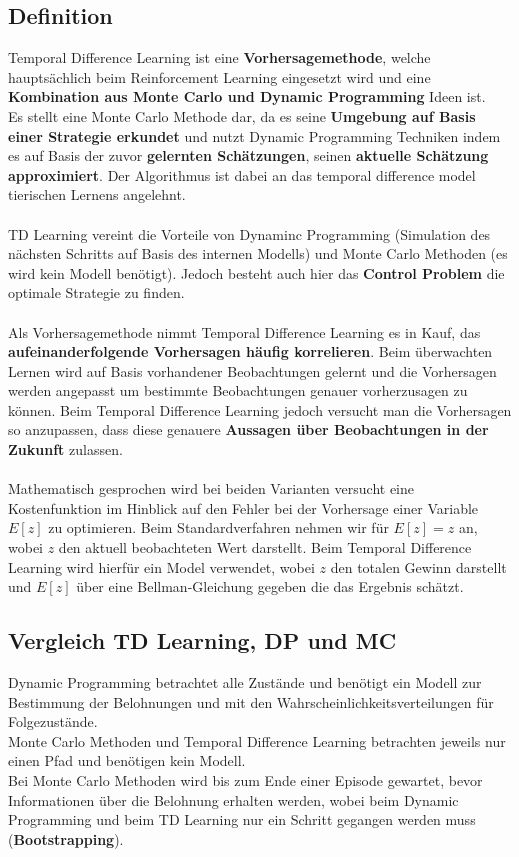 \documentclass[10pt]{scrartcl}
\begin{document}
\subsection{Definition}
Temporal Difference Learning ist eine \textbf{Vorhersagemethode}, welche hauptsächlich beim Reinforcement Learning eingesetzt wird und eine \textbf{Kombination aus Monte Carlo und Dynamic Programming} Ideen ist.\\
Es stellt eine Monte Carlo Methode dar, da es seine \textbf{Umgebung auf Basis einer Strategie erkundet} und nutzt Dynamic Programming Techniken indem es auf Basis der zuvor \textbf{gelernten Schätzungen}, seinen \textbf{aktuelle Schätzung approximiert}. Der Algorithmus ist dabei an das \glqq temporal difference model\grqq\xspace tierischen Lernens angelehnt.\\
\\
TD Learning vereint die Vorteile von Dynaminc Programming (Simulation des nächsten Schritts auf Basis des internen Modells) und Monte Carlo Methoden (es wird kein Modell benötigt). Jedoch besteht auch hier das \textbf{Control Problem} die optimale Strategie zu finden.\\
\\
Als Vorhersagemethode nimmt Temporal Difference Learning es in Kauf, das \textbf{aufeinanderfolgende Vorhersagen häufig korrelieren}. Beim überwachten Lernen wird auf Basis vorhandener Beobachtungen gelernt und die Vorhersagen werden angepasst um bestimmte Beobachtungen genauer vorherzusagen zu können. Beim Temporal Difference Learning jedoch versucht man die Vorhersagen so anzupassen, dass diese genauere \textbf{Aussagen über Beobachtungen in der Zukunft} zulassen.\\
\\
Mathematisch gesprochen wird bei beiden Varianten versucht eine Kostenfunktion im Hinblick auf den Fehler bei der Vorhersage einer Variable $E[z]$ zu optimieren. Beim Standardverfahren nehmen wir für $E[z]=z$ an, wobei $z$ den aktuell beobachteten Wert darstellt. Beim Temporal Difference Learning wird hierfür ein Model verwendet, wobei $z$ den totalen Gewinn darstellt und $E[z]$ über eine Bellman-Gleichung gegeben die das Ergebnis schätzt.

\subsection{Vergleich TD Learning, DP und MC}
Dynamic Programming betrachtet alle Zustände und benötigt ein Modell zur Bestimmung der Belohnungen und mit den Wahrscheinlichkeitsverteilungen für Folgezustände.\\
Monte Carlo Methoden und Temporal Difference Learning betrachten jeweils nur einen Pfad und benötigen kein Modell.\\
Bei Monte Carlo Methoden wird bis zum Ende einer Episode gewartet, bevor Informationen über die Belohnung erhalten werden, wobei beim Dynamic Programming und beim TD Learning nur ein Schritt gegangen werden muss (\textbf{Bootstrapping}).
\end{document}
